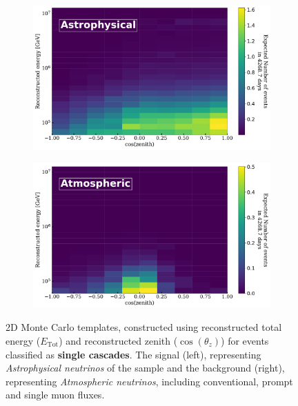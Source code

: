 \begin{figure}[h!]
    \begin{subfigure}[h]{0.72\textwidth}
        \includegraphics{./figures/Analysis/Cascades_Astrophysical.pdf}
    \end{subfigure}
    \hfill
    \begin{subfigure}[h]{0.72\textwidth}
        \includegraphics{./figures/Analysis/Cascades_Atmospheric.pdf}
       
    \end{subfigure}%
    \caption{2D Monte Carlo templates, constructed using reconstructed total energy ($E_{\text{Tot}}$) and reconstructed zenith ($\cos(\theta_z)$) for events classified as \textbf{single cascades}. The signal (left), representing \emph{Astrophysical neutrinos} of the sample and the background (right), representing \emph{Atmospheric neutrinos}, including conventional, prompt and single muon fluxes.}
\end{figure}

